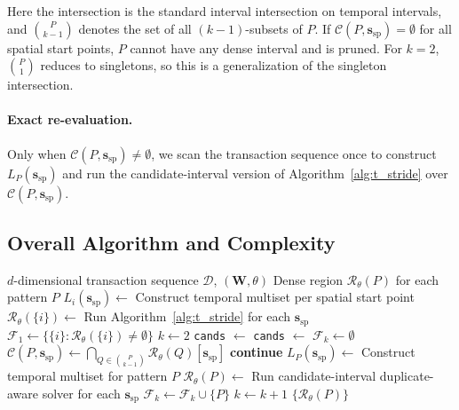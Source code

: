Here the intersection is the standard interval intersection
on temporal intervals, and $\binom{P}{k-1}$ denotes the set of all
$(k{-}1)$-subsets of $P$.
If $\mathcal{C}(P,\bm{s}_{\mathrm{sp}})=\emptyset$
for all spatial start points,
$P$ cannot have any dense interval and is pruned.
For $k=2$, $\binom{P}{1}$ reduces to singletons,
so this is a generalization of the singleton intersection.

\paragraph{Exact re-evaluation.}
Only when $\mathcal{C}(P,\bm{s}_{\mathrm{sp}}) \neq \emptyset$,
we scan the transaction sequence once
to construct $L_P(\bm{s}_{\mathrm{sp}})$
and run the candidate-interval version of
Algorithm~\ref{alg:t_stride}
over $\mathcal{C}(P,\bm{s}_{\mathrm{sp}})$.

\subsection{Overall Algorithm and Complexity}\label{sec:complexity}

\begin{algorithm}[t]
\caption{Multi-Dimensional Apriori-Window (interval-based implementation)}
\label{alg:md_apriori}
\begin{algorithmic}[1]
\Require $d$-dimensional transaction sequence $\mathcal{D}$, $(\bm{W}, \theta)$
\Ensure Dense region $\mathcal{R}_\theta(P)$ for each pattern $P$
  \State $L_i(\bm{s}_{\mathrm{sp}}) \leftarrow$ Construct temporal multiset per spatial start point
  \State $\mathcal{R}_\theta(\{i\}) \leftarrow$ Run Algorithm~\ref{alg:t_stride} for each $\bm{s}_{\mathrm{sp}}$
\EndFor
\State $\mathcal{F}_1 \leftarrow \{\{i\} : \mathcal{R}_\theta(\{i\}) \neq \emptyset\}$
\State $k \leftarrow 2$
  \State \texttt{cands} $\leftarrow$ 
  \State \texttt{cands} $\leftarrow$ 
  \State $\mathcal{F}_k \leftarrow \emptyset$
    \State $\mathcal{C}(P,\bm{s}_{\mathrm{sp}}) \leftarrow \bigcap_{Q \in \binom{P}{k-1}}\mathcal{R}_\theta(Q)[\bm{s}_{\mathrm{sp}}]$
      \State \textbf{continue}
    \EndIf
    \State $L_P(\bm{s}_{\mathrm{sp}}) \leftarrow$ Construct temporal multiset for pattern $P$
    \State $\mathcal{R}_\theta(P) \leftarrow$ Run candidate-interval duplicate-aware solver for each $\bm{s}_{\mathrm{sp}}$
      \State $\mathcal{F}_k \leftarrow \mathcal{F}_k \cup \{P\}$
    \EndIf
  \EndFor
  \State $k \leftarrow k + 1$
\EndWhile
\State \Return $\{\mathcal{R}_\theta(P)\}$
\end{algorithmic}
\end{algorithm}

